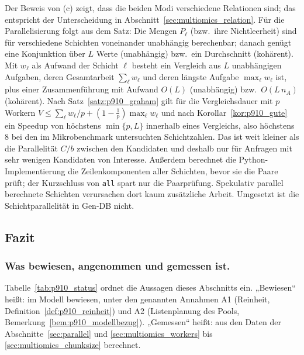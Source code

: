 \documentclass[a4paper,12pt, twoside]{report}
\theoremstyle{definition}
\begin{document}
Der Beweis von (c) zeigt, dass die beiden Modi verschiedene Relationen sind; das entspricht der Unterscheidung in Abschnitt~\ref{sec:multiomics_relation}. Für die Parallelisierung folgt aus dem Satz: Die Mengen $P_\ell$ (bzw.\ ihre Nichtleerheit) sind für verschiedene Schichten voneinander unabhängig berechenbar; danach genügt eine Konjunktion über $L$ Werte (unabhängig) bzw.\ ein Durchschnitt (kohärent). Mit $w_\ell$ als Aufwand der Schicht $\ell$ besteht ein Vergleich aus $L$ unabhängigen Aufgaben, deren Gesamtarbeit $\sum_\ell w_\ell$ und deren längste Aufgabe $\max_\ell w_\ell$ ist, plus einer Zusammenführung mit Aufwand $O(L)$ (unabhängig) bzw.\ $O(L\,n_A)$ (kohärent). Nach Satz~\ref{satz:p910_graham} gilt für die Vergleichsdauer mit $p$ Workern $V\le\sum_\ell w_\ell/p+(1-\frac1p)\max_\ell w_\ell$ und nach Korollar~\ref{kor:p910_gute} ein Speedup von höchstens $\min\{p,L\}$ innerhalb eines Vergleichs, also höchstens $8$ bei den im Mikrobenchmark untersuchten Schichtzahlen. Das ist weit kleiner als die Parallelität $C/b$ zwischen den Kandidaten und deshalb nur für Anfragen mit sehr wenigen Kandidaten von Interesse. Außerdem berechnet die Python-Implementierung die Zeilenkomponenten aller Schichten, bevor sie die Paare prüft; der Kurzschluss von \texttt{all} spart nur die Paarprüfung. Spekulativ parallel berechnete Schichten verursachen dort kaum zusätzliche Arbeit. Umgesetzt ist die Schichtparallelität in Gen-DB nicht.

\subsection{Fazit}
\label{sec:p910_fazit}

\subsubsection{Was bewiesen, angenommen und gemessen ist.} Tabelle~\ref{tab:p910_status} ordnet die Aussagen dieses Abschnitts ein. „Bewiesen“ heißt: im Modell bewiesen, unter den genannten Annahmen A1 (Reinheit, Definition~\ref{def:p910_reinheit}) und A2 (Listenplanung des Pools, Bemerkung~\ref{bem:p910_modellbezug}). „Gemessen“ heißt: aus den Daten der Abschnitte~\ref{sec:parallel} und \ref{sec:multiomics_workers} bis \ref{sec:multiomics_chunksize} berechnet.
\end{document}
